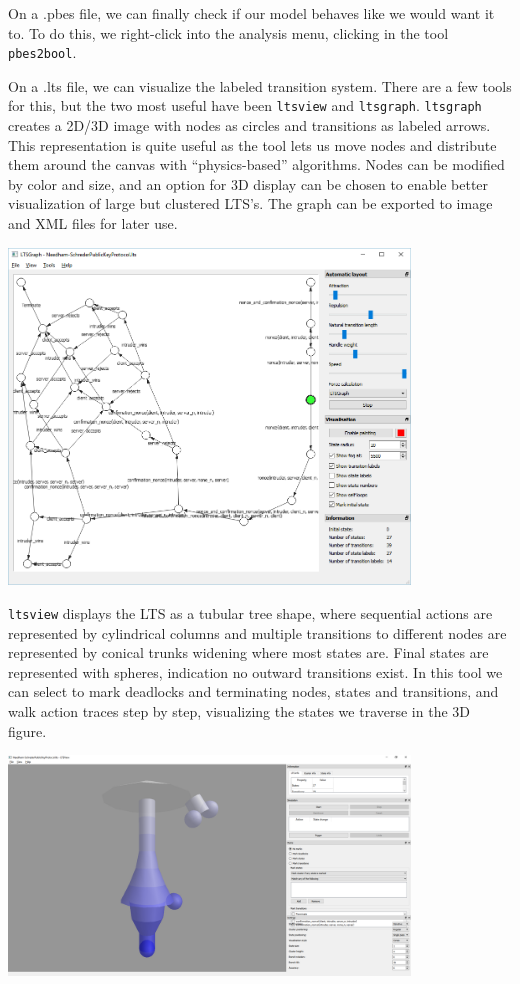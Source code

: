 \documentclass[11pt]{article}
\theoremstyle{definition}
\theoremstyle{plain}
\begin{document}
On a .pbes file, we can finally check if our model behaves like we would want it to. To do this, we right-click into the analysis menu, clicking in the tool \texttt{pbes2bool}.

On a .lts file, we can visualize the labeled transition system. There are a few tools for this, but the two most useful have been \texttt{ltsview} and \texttt{ltsgraph}.
\texttt{ltsgraph} creates a 2D/3D image with nodes as circles and transitions as labeled arrows. This representation is quite useful as the tool lets us move nodes and distribute them around the canvas with ``physics-based'' algorithms. Nodes can be modified by color and size, and an option for 3D display can be chosen to enable better visualization of large but clustered LTS's. The graph can be exported to image and XML files for later use.

\includegraphics[width=0.8\textwidth, keepaspectratio]{img/mCRL2/mcrl2-ltsgraph.png}

\texttt{ltsview} displays the LTS as a tubular tree shape, where sequential actions are represented by cylindrical columns and multiple transitions to different nodes are represented by conical trunks widening where most states are. Final states are represented with spheres, indication no outward transitions exist. In this tool we can select to mark deadlocks and terminating nodes, states and transitions, and walk action traces step by step, visualizing the states we traverse in the 3D figure.

\includegraphics[width=0.8\textwidth, keepaspectratio]{img/mCRL2/mcrl2-ltsview.png}
\end{document}
